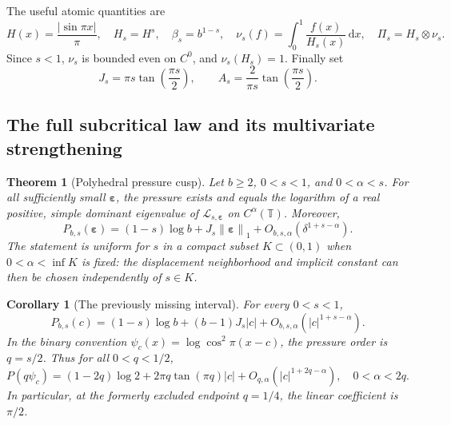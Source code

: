 \documentclass[11pt,a4paper]{article}
\numberwithin{equation}{section}
\newtheorem{theorem}{Theorem}[section]
\newtheorem{corollary}[corollary]{Corollary}
\theoremstyle{definition}
\theoremstyle{remark}
\newcommand{\TT}{\mathbb T}
\newcommand{\dd}{\,\mathrm d}
\newcommand{\Lop}{\mathcal L}
\newcommand{\norm}[1]{\left\lVert#1\right\rVert}
\newcommand{\eps}{\boldsymbol\varepsilon}
\newcommand{\Proj}{\Pi}
\newcommand{\Holder}{C^\alpha(\TT)}
\begin{document}
The useful atomic quantities are
\begin{equation}
 H(x)=\frac{|\sin\pi x|}{\pi},\quad H_s=H^s,\quad
 \beta_s=b^{1-s},\quad
 \nu_s(f)=\int_0^1\frac{f(x)}{H_s(x)}\dd x,\quad
 \Proj_s=H_s\otimes\nu_s.
 \label{eq:atomic-data}
\end{equation}
Since $s<1$, $\nu_s$ is bounded even on $C^0$, and
$\nu_s(H_s)=1$. Finally set
\begin{equation}
 J_s=\pi s\tan\left(\frac{\pi s}{2}\right),\qquad
 A_s=\frac{2}{\pi s}\tan\left(\frac{\pi s}{2}\right).
 \label{eq:constants}
\end{equation}

\subsection{The full subcritical law and its multivariate strengthening}
\begin{theorem}[Polyhedral pressure cusp]
\label{thm:main}
Let $b\geq2$, $0<s<1$, and $0<\alpha<s$. For all sufficiently small
$\eps$, the pressure exists and equals the logarithm of a real positive,
simple dominant eigenvalue of $\Lop_{s,\eps}$ on $\Holder$. Moreover,
\begin{equation}
 \boxed{\quad
 P_{b,s}(\eps)=(1-s)\log b+J_s\norm\eps_1
                   +O_{b,s,\alpha}(\delta^{1+s-\alpha}).
 \quad}
 \label{eq:main}
\end{equation}
The statement is uniform for $s$ in a compact subset $K\subset(0,1)$
when $0<\alpha<\inf K$ is fixed: the displacement neighborhood and
implicit constant can then be chosen independently of $s\in K$.
\end{theorem}

\begin{corollary}[The previously missing interval]
\label{cor:binary}
For every $0<s<1$,
\begin{equation}
 P_{b,s}(c)=(1-s)\log b+(b-1)J_s|c|
                         +O_{b,s,\alpha}(|c|^{1+s-\alpha}).
 \label{eq:common}
\end{equation}
In the binary convention $\psi_c(x)=\log\cos^2\pi(x-c)$, the pressure
order is $q=s/2$. Thus for all $0<q<1/2$,
\begin{equation}
 P(q\psi_c)=(1-2q)\log2+2\pi q\tan(\pi q)|c|
                     +O_{q,\alpha}(|c|^{1+2q-\alpha}),
 \quad 0<\alpha<2q.
 \label{eq:q-convention}
\end{equation}
In particular, at the formerly excluded endpoint $q=1/4$, the linear
coefficient is $\pi/2$.
\end{corollary}
\end{document}
